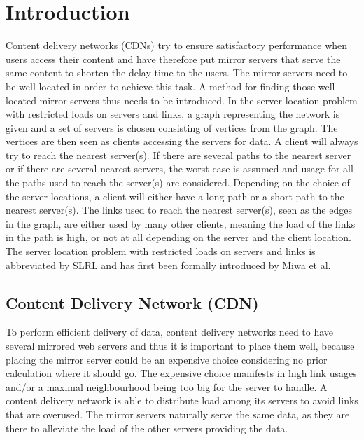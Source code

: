 \documentclass [12pt]{article}
\begin{document}
\thispagestyle{empty}

\newpage
\tableofcontents
\newpage


\section{Introduction}
Content delivery networks (CDNs) try to ensure satisfactory performance when users access their content 
and have therefore put mirror servers that serve the same content to shorten the delay time to the users.
The mirror servers need to be well located in order to achieve this task. A method for finding those well located mirror servers thus needs to be introduced.
In the server location problem with restricted loads on servers and links, a graph representing the network is given and a set of servers is chosen consisting of vertices from the graph. The vertices are then seen as clients
accessing the servers for data. A client will always try to reach the nearest server(s). If there are several paths to the nearest server or if there are several nearest servers, the worst case is assumed
and usage for all the paths used to reach the server(s) are considered.
Depending on the choice of the server locations, a client will either have a long path or a short path to the nearest server(s). The links used to reach the nearest server(s), seen as the edges in the graph,
are either used by many other clients, meaning the load of the links in the path is high, or not at all depending on the server and the client location. The server location problem with restricted loads
on servers and links is abbreviated by SLRL and has first been formally introduced by Miwa et al. \cite{mirrorserver}

\subsection {Content Delivery Network (CDN)}
To perform efficient delivery of data, content delivery networks need to have several mirrored web servers
and thus it is important to place them well, because placing the mirror server 
could be an expensive choice considering no prior calculation where it should go. 
The expensive choice manifests in high link usages and/or a maximal neighbourhood being
too big for the server to handle. A content delivery network is able to distribute load among its servers to avoid
links that are overused.
The mirror servers naturally serve the same data, as they are there to alleviate the 
load of the other servers providing the data.
\end{document}
